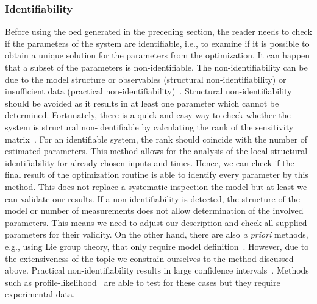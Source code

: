 \documentclass[graybox]{svmult}
\begin{document}
\subsubsection{Identifiability}
Before using the \acl{oed} generated in the preceding section, the reader needs to check if the parameters of the system are identifiable, i.e., to examine if it is possible to obtain a unique solution for the parameters from the optimization.
It can happen that a subset of the parameters is non-identifiable.
The non-identifiability can be due to the model structure or observables (structural non-identifiability) or insufficient data (practical non-identifiability)~\cite{guillaume_introductory_2019, wieland_structural_2021, walter_identifiability_1996}.
Structural non-identifiability should be avoided as it results in at least one parameter which cannot be determined.
Fortunately, there is a quick and easy way to check whether the system is structural non-identifiable by calculating the rank of the sensitivity matrix~\cite{miao_identifiability_2011, stigter_fast_2015}.
For an identifiable system, the rank should coincide with the number of estimated parameters.
This method allows for the analysis of the local structural identifiability for already chosen inputs and times.
Hence, we can check if the final result of the optimization routine is able to identify every parameter by this method.
This does not replace a systematic inspection the model but at least we can validate our results.
If a non-identifiability is detected, the structure of the model or number of measurements does not allow determination of the involved parameters.
This means we need to adjust our description and check all supplied parameters for their validity.
On the other hand, there are also {\it a priori} methods, e.g., using Lie group theory, that only require model definition~\cite{wieland_structural_2021}.
However, due to the extensiveness of the topic we constrain ourselves to the method discussed above.
Practical non-identifiability results in large confidence intervals~\cite{holmberg_practical_1982, miao_identifiability_2011, kreutzProfileLikelihood2013}.
Methods such as profile-likelihood~\cite{wieland_structural_2021} are able to test for these cases but they require experimental data.
%
\end{document}
